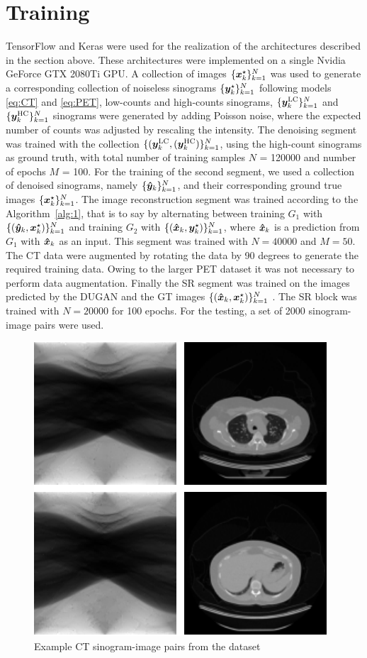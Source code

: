 \section{Training}
TensorFlow \cite{abadi2016tensorflow} and Keras \cite{chollet2015keras} were used for the realization of the architectures described in the section above. These architectures were implemented on a single Nvidia GeForce GTX 2080Ti GPU. A collection of images $\{\bm{x}^\star_k\}_{k=1}^N$ was used to generate a corresponding collection of noiseless sinograms  $\{\bm{y}^\star_k\}_{k=1}^N$ following models \eqref{eq:CT} and \eqref{eq:PET}, low-counts and high-counts sinograms, $\{\bm{y}^\mathrm{LC}_k\}_{k=1}^N$ and $\{\bm{y}^\mathrm{HC}_k\}_{k=1}^N$ sinograms were generated by adding Poisson noise, where the expected number of counts was adjusted by rescaling the intensity. The denoising segment was trained with the collection $\{(\bm{y}^\mathrm{LC}_k,(\bm{y}^\mathrm{HC}_k)\}_{k=1}^N$, using the high-count sinograms as ground truth, with total number of training samples $N$ = 120000 and number of epochs $M$ = 100.  
For the training of the second segment, we used a collection of denoised sinograms, namely  $\{\bm{\hat{y}}_k\}_{k=1}^N$, and their corresponding ground true images $\{\bm{x}^\star_k\}_{k=1}^N$. 
The image reconstruction segment was trained according to the Algorithm~\ref{alg:1}, that is to say by alternating between training $G_1$ with $\{(\bm{\hat{y}}_k, \bm{x}^\star_k)\}_{k=1}^N$ and training  $G_2$ with $\{(\bm{\hat{x}}_k,\bm{y}^\star_k)\}_{k=1}^N$, where $\bm{\hat{x}}_k$ is a prediction from $G_1$ with $\bm{\hat{x}}_k$ as an input. This segment was trained with $N = 40000$ and $M = 50$.
The \ac{CT} data were augmented by rotating the data by 90 degrees to generate the required training data. Owing to the larger \ac{PET} dataset it was not necessary to perform data augmentation. Finally the \ac{SR} segment was trained on the images predicted by the \ac{DUGAN} and the \ac{GT} images $\{(\bm{\hat{x}}_k, \bm{x}^\star_k)\}_{k=1}^N $ . The \ac{SR} block was trained with $N = 20000$ for 100 epochs.
For the testing, a set of 2000 sinogram-image pairs were used.

\begin{figure}[!htbp]
	\centering
	\includegraphics[width=0.5\linewidth]{./Figures/CT_sample-crop.pdf}
	\caption{Example CT sinogram-image pairs from the dataset }
	\label{fig:phantom}
\end{figure}



